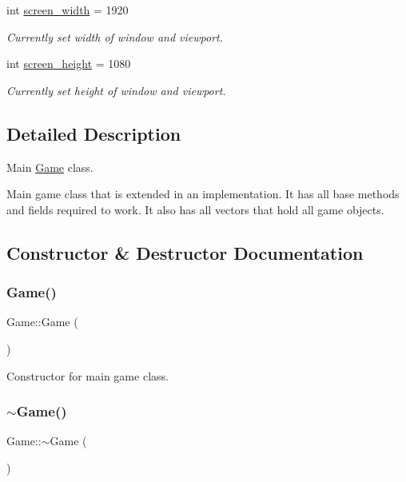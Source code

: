 \begin{DoxyCompactItemize}
int \mbox{\hyperlink{class_game_ac05df6adfb712932bac2afea1fb01dc3}{screen\+\_\+width}} = 1920
\begin{DoxyCompactList}\small\item\em Currently set width of window and viewport. \end{DoxyCompactList}\item 
int \mbox{\hyperlink{class_game_ab52e2343e6335e426a6395c44f4dab71}{screen\+\_\+height}} = 1080
\begin{DoxyCompactList}\small\item\em Currently set height of window and viewport. \end{DoxyCompactList}\end{DoxyCompactItemize}


\subsection{Detailed Description}
Main \mbox{\hyperlink{class_game}{Game}} class. 

Main game class that is extended in an implementation. It has all base methods and fields required to work. It also has all vectors that hold all game objects. 

\subsection{Constructor \& Destructor Documentation}
\mbox{\label{class_game_ad59df6562a58a614fda24622d3715b65}} 
\subsubsection{\texorpdfstring{Game()}{Game()}}
{\footnotesize\ttfamily Game\+::\+Game (\begin{DoxyParamCaption}{ }\end{DoxyParamCaption})}



Constructor for main game class. 

\mbox{\label{class_game_ae3d112ca6e0e55150d2fdbc704474530}} 
\subsubsection{\texorpdfstring{$\sim$Game()}{~Game()}}
{\footnotesize\ttfamily Game\+::$\sim$\+Game (\begin{DoxyParamCaption}{ }\end{DoxyParamCaption})}



